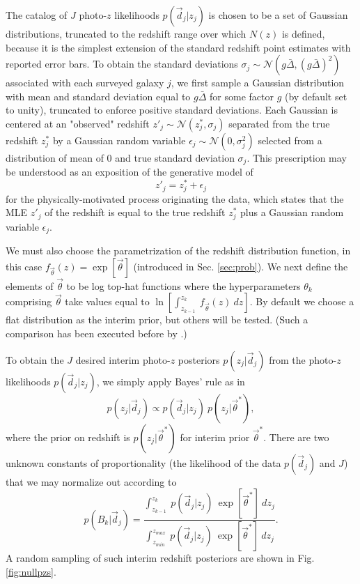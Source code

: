 \documentclass[preprint]{aastex}
\begin{document}
The catalog of $J$ photo-$z$ likelihoods $p(\vec{d}_{j}|z_{j})$ is chosen to be 
a set of Gaussian distributions, truncated to the redshift range over which 
$N(z)$ is defined, because it is the simplest extension of the standard 
redshift point estimates with reported error bars.  To obtain the standard 
deviations $\sigma_{j}\sim\mathcal{N}(g\bar{\Delta},(g\bar{\Delta})^{2})$ 
associated with each surveyed galaxy $j$, we first sample a Gaussian 
distribution with mean and standard deviation equal to $g\bar{\Delta}$ for some 
factor $g$ (by default set to unity), truncated to enforce positive standard 
deviations.  Each Gaussian is centered at an "observed" redshift 
$z'_{j}\sim\mathcal{N}(z^{*}_{j},\sigma_{j})$ separated from the true redshift 
$z^{*}_{j}$ by a Gaussian random variable 
$\epsilon_{j}\sim\mathcal{N}(0,\sigma^{2}_{j})$ selected from a distribution of 
mean of 0 and true standard deviation $\sigma_{j}$.   This prescription may be 
understood as an exposition of the generative model of 
\begin{equation}
\label{eq:genmod}
z'_{j} = z^{*}_{j}+\epsilon_{j}
\end{equation}
for the physically-motivated process originating the data, which states that 
the MLE $z'_{j}$ of the redshift is equal to the true redshift $z^{*}_{j}$ plus 
a Gaussian random variable $\epsilon_{j}$.

We must also choose the parametrization of the redshift distribution function, 
in this case $f_{\vec{\theta}}(z)=\exp[\vec{\theta}]$ (introduced in Sec. 
\ref{sec:prob}).  We next define the elements of $\vec{\theta}$ to be log 
top-hat functions where the hyperparameters $\theta_{k}$ comprising 
$\vec{\theta}$ take values equal to $\ln[\int_{z_{k-1}}^{z_{k}}\ 
f_{\vec{\theta}}(z)\ dz]$.  By default we choose a flat distribution as the 
interim prior, but others will be tested.  (Such a comparison has been executed 
before by \citet{Viironen2015}.)

To obtain the $J$ desired interim photo-$z$ posteriors $p(z_{j}|\vec{d}_{j})$ 
from the photo-$z$ likelihoods $p(\vec{d}_{j}|z_{j})$, we simply apply Bayes' 
rule as in 
\begin{equation}
\label{eq:likpost}
p(z_{j}|\vec{d}_{j}) \propto p(\vec{d}_{j}|z_{j})\ p(z_{j}|\vec{\theta}^{*}),
\end{equation}
where the prior on redshift is $p(z_{j}|\vec{\theta}^{*})$ for interim prior 
$\vec{\theta}^{*}$.  There are two unknown constants of proportionality (the 
likelihood of the data $p(\vec{d}_{j})$ and $J$) that we may normalize out 
according to 
\begin{equation}
\label{eq:norm}
p(B_{k}|\vec{d}_{j}) = \frac{\int_{z_{k-1}}^{z_{k}}\ p(\vec{d}_{j}|z_{j})\ 
\exp[\vec{\theta}^{*}]\ dz_{j}}{\int_{z_{min}}^{z_{max}}\ p(\vec{d}_{j}|z_{j})\ 
\exp[\vec{\theta}^{*}]\ dz_{j}}.
\end{equation}
A random sampling of such interim redshift posteriors are shown in Fig. 
\ref{fig:nullpzs}.  
\end{document}
